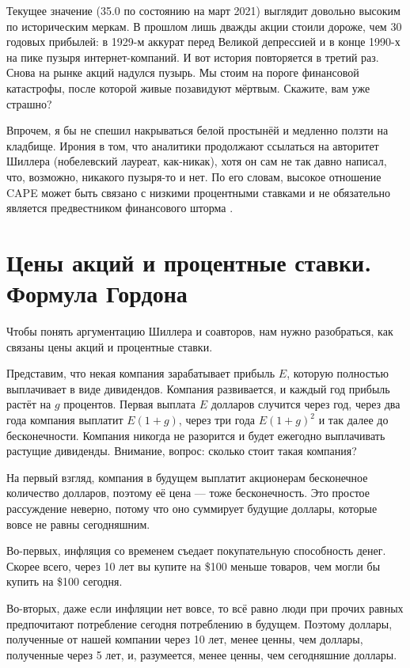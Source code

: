 Текущее значение (35.0 по состоянию на март 2021) выглядит довольно высоким по историческим меркам. В прошлом лишь дважды акции стоили дороже, чем 30 годовых прибылей: в 1929-м аккурат перед Великой депрессией и в конце 1990-х на пике пузыря интернет-компаний. И вот история повторяется в третий раз. Снова на рынке акций надулся пузырь. Мы стоим на пороге финансовой катастрофы, после которой живые позавидуют мёртвым. Скажите, вам уже страшно?

Впрочем, я бы не спешил накрываться белой простынёй и медленно ползти на кладбище. Ирония в том, что аналитики продолжают ссылаться на авторитет Шиллера (нобелевский лауреат, как-никак), хотя он сам не так давно написал, что, возможно, никакого пузыря-то и нет. По его словам, высокое отношение CAPE может быть связано с низкими процентными ставками и не обязательно является предвестником финансового шторма \cite{shiller2020cape}.

\section*{Цены акций и процентные ставки. Формула Гордона}

Чтобы понять аргументацию Шиллера и соавторов, нам нужно разобраться, как связаны цены акций и процентные ставки.

Представим, что некая компания зарабатывает прибыль $E$, которую полностью выплачивает в виде дивидендов. Компания развивается, и каждый год прибыль растёт на $g$ процентов. Первая выплата $E$ долларов случится через год, через два года компания выплатит $E(1+g)$, через три года $E(1+g)^2$ и так далее до бесконечности. Компания никогда не разорится и будет ежегодно выплачивать  растущие дивиденды. Внимание, вопрос: сколько стоит такая компания?

На первый взгляд, компания в будущем выплатит акционерам бесконечное количество долларов, поэтому её цена --- тоже бесконечность. Это простое рассуждение неверно, потому что оно суммирует будущие доллары, которые вовсе не равны сегодняшним.

Во-первых, инфляция со временем съедает покупательную способность денег. Скорее всего, через 10 лет вы купите на \$100 меньше товаров, чем могли бы купить на \$100 сегодня.

Во-вторых, даже если инфляции нет вовсе, то всё равно люди при прочих равных предпочитают потребление сегодня потреблению в будущем. Поэтому доллары, полученные от нашей компании через 10 лет, менее ценны, чем доллары, полученные через 5 лет, и, разумеется, менее ценны, чем сегодняшние доллары.

